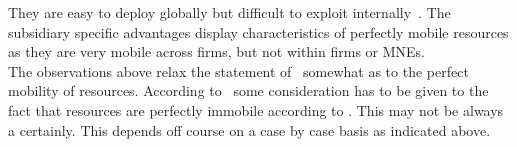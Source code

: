 They are easy to deploy globally but difficult to exploit internally~\citep{Rugman:2001ti}.
The subsidiary specific advantages display characteristics of perfectly mobile resources as they are very mobile across firms, but not within firms or MNEs.\\
The observations above relax the statement of~\cite{Barney:1991ur} somewhat as to the perfect mobility of resources.
According to~\citep{Rugman:2001ti,Tseng:2007wm,Erramilli:1997wu,Hu:1995vg,Rugman:1992uj} some consideration has to be given to the fact that resources are perfectly immobile according to \rbt.
This may not be always a certainly.
This depends off course on a case by case basis as indicated above.
 

